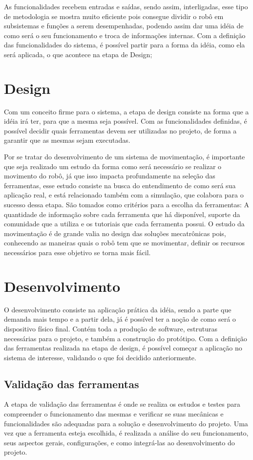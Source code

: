 As funcionalidades recebem entradas e saídas, sendo assim, interligadas, esse tipo de metodologia se mostra muito eficiente pois consegue dividir o robô em subsistemas e funções a serem desempenhadas, podendo assim dar uma idéia de como será o seu funcionamento e troca de informações internas. Com a definição das funcionalidades do sistema, é possível partir para a forma da idéia, como ela será aplicada, o que acontece na etapa de Design;  


\section{Design}
\label{sec:design}
Com um conceito firme para o sistema, a etapa de design consiste na forma que a idéia irá ter, para que a mesma seja possível. Com as funcionalidades definidas, é possível decidir quais ferramentas devem ser utilizadas no projeto, de forma a garantir que as mesmas sejam executadas. 

Por se tratar do desenvolvimento de um sistema de movimentação, é importante que seja realizado um estudo da forma como será necessário se realizar o movimento do robô, já que isso impacta profundamente na seleção das ferramentas, esse estudo consiste na busca do entendimento de como será sua aplicação real, e está relacionado também com a simulação, que colabora para o sucesso dessa etapa. São tomados como critérios para a escolha da ferramentas: A quantidade de informação sobre cada ferramenta que há disponível, suporte da comunidade que a utiliza e os tutoriais que cada ferramenta possui. O estudo da movimentação é de grande valia no design das soluções mecatrônicas pois, conhecendo as maneiras quais o robô tem que se movimentar, definir os recursos necessários para esse objetivo se torna mais fácil.

\section{Desenvolvimento}
\label{sec:Desen}
O desenvolvimento consiste na aplicação prática da idéia, sendo a parte que demanda mais tempo e a partir dela, já é possível ter a noção de como será o dispositivo físico final. Contém toda a produção de software, estruturas necessárias para o projeto, e também a construção do protótipo. Com a definição das ferramentas realizada na etapa de design, é possível começar a aplicação no sistema de interesse, validando o que foi decidido anteriormente.

\subsection{Validação das ferramentas}
\label{ssec:val_ferra}
A etapa de validação das ferramentas é onde se realiza os estudos e testes para compreender o funcionamento das mesmas e verificar se suas mecânicas e funcionalidades são adequadas para a solução e desenvolvimento do projeto. Uma vez que a ferramenta esteja escolhida, é realizada a análise do seu funcionamento, seus aspectos gerais, configurações, e como integrá-las ao desenvolvimento do projeto.

